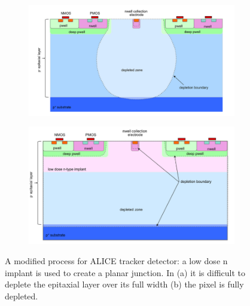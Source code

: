       \begin{figure}
         \centering
         \begin{subfigure}[b]{0.52\textwidth}
             \centering
             \includegraphics[width=\linewidth]{figures/Pixel_detectors/ALPIDE_before_PM.png}
             \caption{}
             \label{fig:ALPIDE_before_PM}
         \end{subfigure}
         \hfill
         \begin{subfigure}[b]{0.47\textwidth}
             \centering
             \includegraphics[width=\linewidth]{figures/Pixel_detectors/ALPIDE_after_PM.png} 
             \caption{}
             \label{fig:ALPIDE_after_PM}
         \end{subfigure}
         \caption{A modified process for ALICE tracker detector: a low dose n implant is used to create a planar junction. In (a) it is difficult to deplete the epitaxial layer over its full
         width (b) the pixel is fully depleted.}
         \label{fig:modified_process}
      \end{figure}

